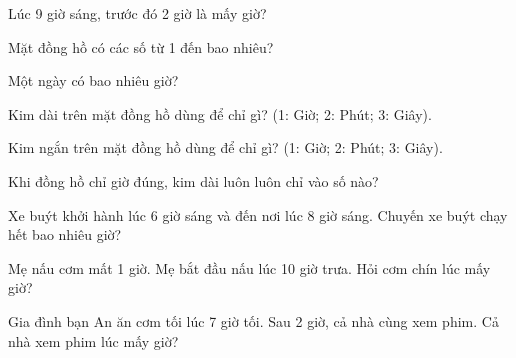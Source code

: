 \begin{ex}
Lúc 9 giờ sáng, trước đó 2 giờ là mấy giờ?
\end{ex}

\begin{ex}
Mặt đồng hồ có các số từ 1 đến bao nhiêu?
\end{ex}

\begin{ex}
Một ngày có bao nhiêu giờ?
\end{ex}

\begin{ex}
Kim dài trên mặt đồng hồ dùng để chỉ gì? (1: Giờ; 2: Phút; 3: Giây).
\end{ex}

\begin{ex}
Kim ngắn trên mặt đồng hồ dùng để chỉ gì? (1: Giờ; 2: Phút; 3: Giây).
\end{ex}

\begin{ex}
Khi đồng hồ chỉ giờ đúng, kim dài luôn luôn chỉ vào số nào?
\end{ex}

\begin{ex}
Xe buýt khởi hành lúc 6 giờ sáng và đến nơi lúc 8 giờ sáng. Chuyến xe buýt chạy hết bao nhiêu giờ?
\end{ex}

\begin{ex}
Mẹ nấu cơm mất 1 giờ. Mẹ bắt đầu nấu lúc 10 giờ trưa. Hỏi cơm chín lúc mấy giờ?
\end{ex}

\begin{ex}
Gia đình bạn An ăn cơm tối lúc 7 giờ tối. Sau 2 giờ, cả nhà cùng xem phim. Cả nhà xem phim lúc mấy giờ?
\end{ex}

